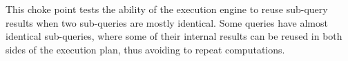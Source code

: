 
This choke point tests the ability of the execution engine to reuse sub-query
results when two sub-queries are mostly identical. Some queries have almost
identical sub-queries, where some of their internal results can be reused in
both sides of the execution plan, thus avoiding to repeat computations.


